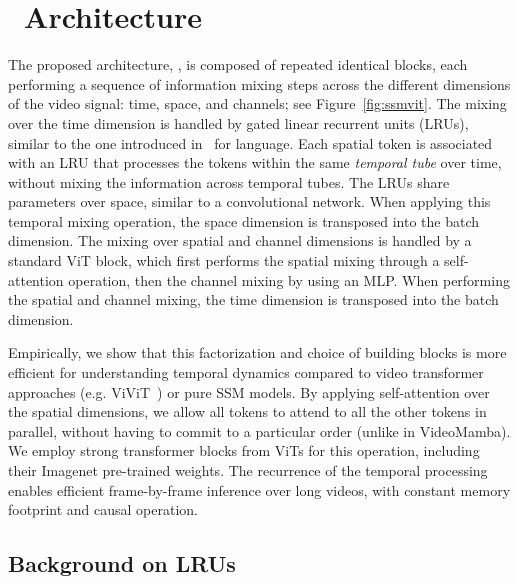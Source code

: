 

\section{\ssm\ Architecture}
\label{sec:model}

The proposed architecture, \ssm, is composed of repeated identical blocks, each performing a sequence of information mixing steps across the different dimensions of the video signal: time, space, and channels; see Figure~\ref{fig:ssmvit}. The mixing over the time dimension is handled by gated linear recurrent units (LRUs), similar to the one introduced in~\citep{de2024griffinmixinggatedlinear} for language. Each spatial token is associated with an LRU that processes the tokens within the same \textit{temporal tube} over time, without mixing the information across temporal tubes. The LRUs share parameters over space, similar to a convolutional network. When applying this temporal mixing operation, the space dimension is transposed into the batch dimension.
The mixing over spatial and channel dimensions is handled by a standard ViT block, which first performs the spatial mixing through a self-attention operation, then the channel mixing by using an MLP. When performing the spatial and channel mixing, the time dimension is transposed into the batch dimension.

Empirically, we show that this factorization and choice of building blocks is more efficient for understanding temporal dynamics compared to video transformer approaches (e.g. ViViT~\citep{vivit}) or pure SSM models. By applying self-attention over the spatial dimensions, we allow all tokens to attend to all the other tokens in  parallel, without having to commit to a particular order (unlike in VideoMamba). We employ strong transformer blocks from ViTs for this operation, including their Imagenet pre-trained weights. The recurrence of the temporal processing enables efficient frame-by-frame inference over long videos, with constant memory footprint and causal operation. 

\subsection{Background on LRUs}

